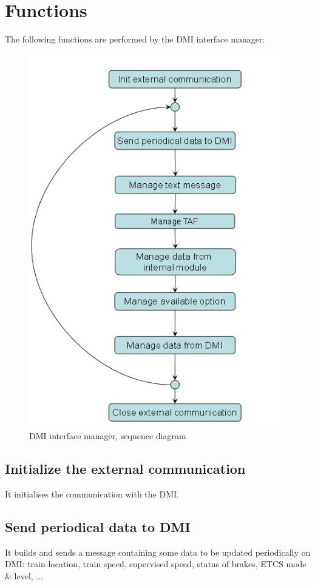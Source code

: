 \documentclass[nocc]{template/openetcs_report}
\begin{document}
\section{Functions}
The following functions are performed by the DMI interface manager:
\begin{figure}[!h]
  \centering
  \includegraphics[width=\textwidth]{image/evc_dmi_interf_manager}
  \caption{DMI interface manager, sequence diagram}
  \label{fig:DMI interface manager, sequence diagram}
\end{figure}
\subsection{Initialize the external communication}
It initialises the communication with the DMI.
\subsection{Send periodical data to DMI}
It builds and sends a message containing some data to be updated periodically on DMI: train location, train speed, supervised speed, status of brakes, ETCS mode \& level, ...
\end{document}
